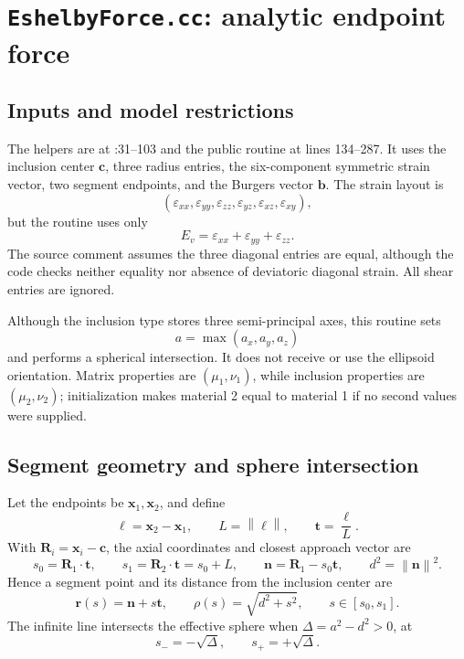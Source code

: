 \documentclass[11pt]{article}
\newcommand{\vect}[1]{\bm{#1}}
\newcommand{\norm}[1]{\left\lVert #1\right\rVert}
\begin{document}
\section{\texttt{EshelbyForce.cc}: analytic endpoint force}

\subsection{Inputs and model restrictions}

The helpers are at :31--103 and the public routine at
lines 134--287.  It uses the inclusion center \(\vect{c}\), three radius
entries, the six-component symmetric strain vector, two segment endpoints,
and the Burgers vector \(\vect{b}\).  The strain layout is
\[
(\varepsilon_{xx},\varepsilon_{yy},\varepsilon_{zz},
  \varepsilon_{yz},\varepsilon_{xz},\varepsilon_{xy}),
\]
but the routine uses only
\[
E_v=\varepsilon_{xx}+\varepsilon_{yy}+\varepsilon_{zz}.
\]
The source comment assumes the three diagonal entries are equal, although the
code checks neither equality nor absence of deviatoric diagonal strain.  All
shear entries are ignored.

Although the inclusion type stores three semi-principal axes, this routine sets
\begin{equation}
a=\max(a_x,a_y,a_z)
\label{eq:max-radius}
\end{equation}
and performs a spherical intersection.  It does not receive or use the
ellipsoid orientation.  Matrix properties are \((\mu_1,\nu_1)\), while
inclusion properties are \((\mu_2,\nu_2)\); initialization makes material 2
equal to material 1 if no second values were supplied.

\subsection{Segment geometry and sphere intersection}

Let the endpoints be \(\vect{x}_1,\vect{x}_2\), and define
\begin{equation}
\vect{\ell}=\vect{x}_2-\vect{x}_1,
\qquad L=\norm{\vect{\ell}},
\qquad \vect{t}=\frac{\vect{\ell}}{L}.
\label{eq:segment-tangent}
\end{equation}
With \(\vect{R}_i=\vect{x}_i-\vect{c}\), the axial coordinates and closest
approach vector are
\begin{equation}
s_0=\vect{R}_1\mathbin{\cdot}\vect{t},
\qquad
s_1=\vect{R}_2\mathbin{\cdot}\vect{t}=s_0+L,
\qquad
\vect{n}=\vect{R}_1-s_0\vect{t},
\qquad d^2=\norm{\vect{n}}^2.
\label{eq:line-coordinates}
\end{equation}
Hence a segment point and its distance from the inclusion center are
\begin{equation}
\vect{r}(s)=\vect{n}+s\vect{t},
\qquad
\rho(s)=\sqrt{d^2+s^2},
\qquad s\in[s_0,s_1].
\label{eq:line-parameterization}
\end{equation}
The infinite line intersects the effective sphere when
\(\Delta=a^2-d^2>0\), at
\begin{equation}
s_-=-\sqrt{\Delta},
\qquad s_+=+\sqrt{\Delta}.
\label{eq:sphere-intersection}
\end{equation}
\end{document}
